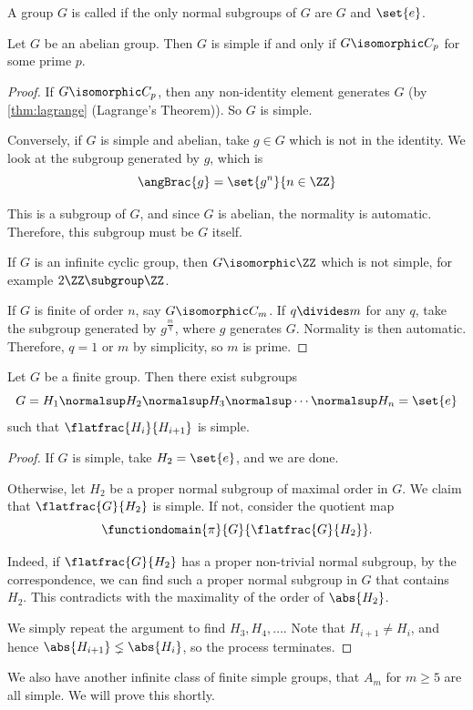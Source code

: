 \begin{definition}[Simplicity]
    \label{def:simplicity}%
    A group \(G\) is called  if the only normal subgroups of \(G\) are \(G\) and \(\set{e}\).
\end{definition}

\begin{proposition}
    \label{prop:abelian-group-simplicity}%
    Let \(G\) be an abelian group. Then \(G\) is simple if and only if \(G \isomorphic C_p\) for some prime \(p\).
\end{proposition}

\begin{proof}
    If \(G \isomorphic C_p\), then any non-identity element generates \(G\) (by \autoref{thm:lagrange} (Lagrange's Theorem)). So \(G\) is simple.

    Conversely, if \(G\) is simple and abelian, take \(g \in G\) which is not in the identity. We look at the subgroup generated by \(g\), which is
    \[
        \angBrac{g} = \set{g^n}{n \in \ZZ}
    \]

    This is a subgroup of \(G\), and since \(G\) is abelian, the normality is automatic. Therefore, this subgroup must be \(G\) itself.

    If \(G\) is an infinite cyclic group, then \(G \isomorphic \ZZ\) which is not simple, for example \(2\ZZ \subgroup \ZZ\).

    If \(G\) is finite of order \(n\), say \(G \isomorphic C_m\). If \(q \divides m\) for any \(q\), take the subgroup generated by \(g^{\frac{m}{q}}\), where \(g\) generates \(G\). Normality is then automatic. Therefore, \(q = 1\) or \(m\) by simplicity, so \(m\) is prime.
\end{proof}

\begin{theorem}
    \label{thm:infinite-chain-normal-subgroup}%
    Let \(G\) be a finite group. Then there exist subgroups
    \[
        G = H_1 \normalsup H_2 \normalsup H_3 \normalsup \cdots \normalsup H_n = \set{e}
    \]
    such that \(\flatfrac{H_i}{H_{i + 1}}\) is simple.
\end{theorem}

\begin{proof}
    If \(G\) is simple, take \(H_2 = \set{e}\), and we are done.

    Otherwise, let \(H_2\) be a proper normal subgroup of maximal order in \(G\). We claim that \(\flatfrac{G}{H_2}\) is simple. If not, consider the quotient map
    \[
        \functiondomain{\pi}{G}{\flatfrac{G}{H_2}}.
    \]

    Indeed, if \(\flatfrac{G}{H_2}\) has a proper non-trivial normal subgroup, by the correspondence, we can find such a proper normal subgroup in \(G\) that contains \(H_2\). This contradicts with the maximality of the order of \(\abs{H_2}\).

    We simply repeat the argument to find \(H_3, H_4, \ldots\). Note that \(H_{i + 1} \neq H_i\), and hence \(\abs{H_{i + 1}} \lneq \abs{H_i}\), so the process terminates.
\end{proof}

\begin{remark}
    We also have another infinite class of finite simple groups, that \(A_m\) for \(m \geq 5\) are all simple. We will prove this shortly.
\end{remark}